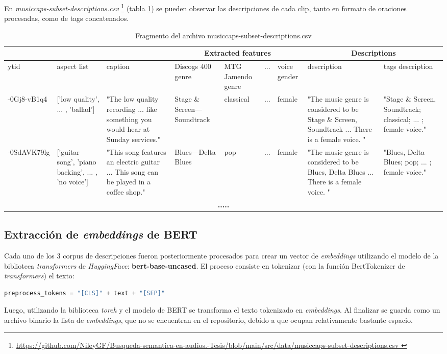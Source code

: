 En \textit{musiccaps-subset-descriptions.csv} \footnote{\href{https://github.com/NileyGF/Busqueda-semantica-en-audios.-Tesis/blob/main/src/data/musiccaps-subset-descriptions.csv} {https://github.com/NileyGF/Busqueda-semantica-en-audios.-Tesis/blob/main/src/data/musiccaps-subset-descriptions.csv } } (tabla \ref{tab:descriptions.csv})  se pueden observar las descripciones de cada clip, tanto en formato de oraciones procesadas, como de tags concatenados. 
\begin{table} [h]
    \tiny
    \centering
    \begin{tabular} { | p{5em} | p{4em} | p{6em} | p{4em} | p{4em} | c | p{4em} | p{6em} | p{6em} |}
    \hline
     \multicolumn{3}{|c|}{ } & \multicolumn{4}{|c|}{Extracted features} & \multicolumn{2}{|c|}{Descriptions} \\
    \hline
        ytid    & aspect list & caption &Discogs 400 genre & MTG Jamendo genre & ... & voice gender & description & tags description \\ 
    \hline
    -0Gj8-vB1q4 &['low quality', ... , 'ballad'] &"The low quality recording ... like something you would hear at Sunday services." & Stage \& Screen---Soundtrack & classical & ... & female &"The music genre is considered to be Stage \& Screen, Soundtrack ... There is a female voice. " &"Stage \& Screen, Soundtrack; classical; ... ; female voice."\\
    \hline
    -0SdAVK79lg &['guitar song', 'piano backing', ... , 'no voice'] &"This song features an electric guitar ... This song can be played in a coffee shop."  & Blues---Delta Blues & pop & ... & female &"The music genre is considered to be Blues, Delta Blues ... There is a female voice. " &"Blues, Delta Blues; pop; ... ; female voice."\\
    \hline
    \multicolumn{9}{|c|}{ \textbf{.....} } \\ 
    \hline
    \end{tabular}
    \caption{Fragmento del archivo musiccaps-subset-descriptions.csv}
    \label{tab:descriptions.csv}
\end{table}

\subsection{Extracción de \textit{embeddings} de BERT}
\label{subsec:bert-embedd-extr}

Cada uno de los 3 corpus de descripciones fueron posteriormente procesados para crear un vector de \textit{embeddings} utilizando el modelo de la biblioteca \textit{transformers} de \textit{HuggingFace}: \textbf{bert-base-uncased}. El proceso consiste en tokenizar (con la función BertTokenizer de 
\textit{transformers}) el texto: 
\begin{lstlisting}[language=Python]
preprocess_tokens = "[CLS]" + text + "[SEP]"
\end{lstlisting} 
Luego, utilizando la biblioteca \textit{torch} y el modelo de BERT se transforma el texto tokenizado en \textit{embeddings}. Al finalizar se guarda como un archivo binario la lista de \textit{embeddings}, que no se encuentran en el repositorio, debido a que ocupan relativamente bastante espacio.

